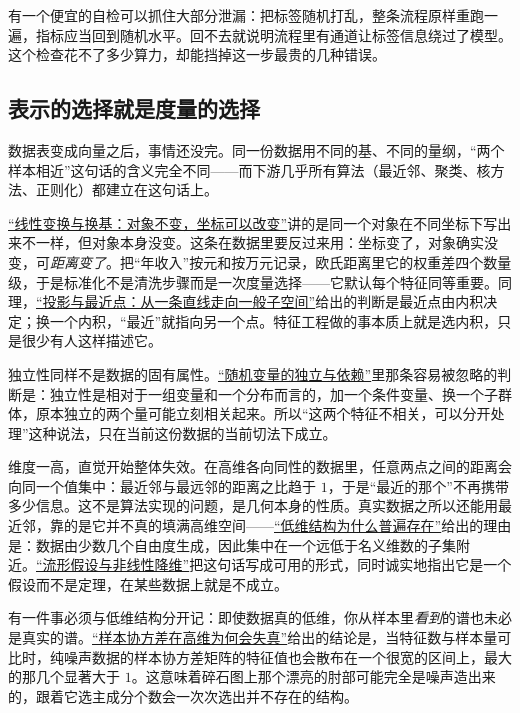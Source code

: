 有一个便宜的自检可以抓住大部分泄漏：把标签随机打乱，整条流程原样重跑一遍，指标应当回到随机水平。回不去就说明流程里有通道让标签信息绕过了模型。这个检查花不了多少算力，却能挡掉这一步最贵的几种错误。

\subsection{表示的选择就是度量的选择}

数据表变成向量之后，事情还没完。同一份数据用不同的基、不同的量纲，``两个样本相近''这句话的含义完全不同——而下游几乎所有算法（最近邻、聚类、核方法、正则化）都建立在这句话上。

\hyperref[sec:03-Linear-Algebra/02-Vector-Spaces/04]{``线性变换与换基：对象不变，坐标可以改变''}讲的是同一个对象在不同坐标下写出来不一样，但对象本身没变。这条在数据里要反过来用：坐标变了，对象确实没变，可\emph{距离变了}。把``年收入''按元和按万元记录，欧氏距离里它的权重差四个数量级，于是标准化不是清洗步骤而是一次度量选择——它默认每个特征同等重要。同理，\hyperref[sec:03-Linear-Algebra/03-Orthogonality/02]{``投影与最近点：从一条直线走向一般子空间''}给出的判断是最近点由内积决定；换一个内积，``最近''就指向另一个点。特征工程做的事本质上就是选内积，只是很少有人这样描述它。

独立性同样不是数据的固有属性。\hyperref[sec:05-Probability/05-Joint-Distributions/02]{``随机变量的独立与依赖''}里那条容易被忽略的判断是：独立性是相对于一组变量和一个分布而言的，加一个条件变量、换一个子群体，原本独立的两个量可能立刻相关起来。所以``这两个特征不相关，可以分开处理''这种说法，只在当前这份数据的当前切法下成立。

维度一高，直觉开始整体失效。在高维各向同性的数据里，任意两点之间的距离会向同一个值集中：最近邻与最远邻的距离之比趋于 \(1\)，于是``最近的那个''不再携带多少信息。这不是算法实现的问题，是几何本身的性质。真实数据之所以还能用最近邻，靠的是它并不真的填满高维空间——\hyperref[sec:12-Real-Analysis-Support/10-Essential-Structures/02]{``低维结构为什么普遍存在''}给出的理由是：数据由少数几个自由度生成，因此集中在一个远低于名义维数的子集附近。\hyperref[sec:13-Machine-Learning/04-Dimensionality-Reduction/04]{``流形假设与非线性降维''}把这句话写成可用的形式，同时诚实地指出它是一个假设而不是定理，在某些数据上就是不成立。

有一件事必须与低维结构分开记：即使数据真的低维，你从样本里\emph{看到}的谱也未必是真实的谱。\hyperref[sec:11-Mathematical-Statistics/09-Random-Matrix-Theory/01]{``样本协方差在高维为何会失真''}给出的结论是，当特征数与样本量可比时，纯噪声数据的样本协方差矩阵的特征值也会散布在一个很宽的区间上，最大的那几个显著大于 \(1\)。这意味着碎石图上那个漂亮的肘部可能完全是噪声造出来的，跟着它选主成分个数会一次次选出并不存在的结构。

